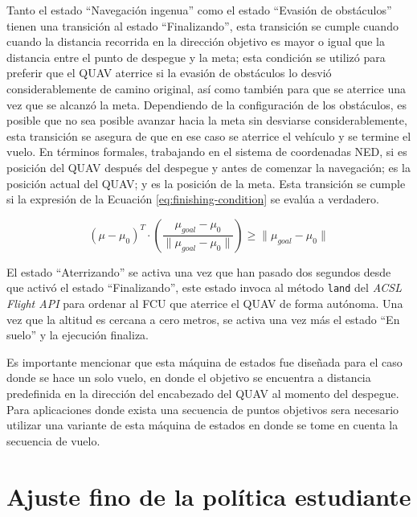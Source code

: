 Tanto el estado ``Navegación ingenua'' como el estado ``Evasión de obstáculos'' tienen una transición al estado ``Finalizando'', esta transición se cumple cuando cuando la distancia recorrida en la dirección objetivo es mayor o igual que la distancia entre el punto de despegue y la meta; esta condición se utilizó para preferir que el QUAV aterrice si la evasión de obstáculos lo desvió considerablemente de camino original, así como también para que se aterrice una vez que se alcanzó la meta. Dependiendo de la configuración de los obstáculos, es posible que no sea posible avanzar hacia la meta sin desviarse considerablemente, esta transición se asegura de que en ese caso se aterrice el vehículo y se termine el vuelo. En términos formales, trabajando en el sistema de coordenadas NED, si  es posición del QUAV después del despegue y antes de comenzar la navegación; \jim{\mu} es la posición actual del QUAV; y  es la posición de la meta. Esta transición se cumple si la expresión de la Ecuación \ref{eq:finishing-condition} se evalúa a verdadero.

\begin{equation}
    \label{eq:finishing-condition}
    (\mu - \mu_0)^T \cdot \left (\frac{\mu_{goal} - \mu_0}{\|\mu_{goal} - \mu_0\|}  \right) \geq \|\mu_{goal} - \mu_0\|
\end{equation}

El estado ``Aterrizando'' se activa una vez que han pasado dos segundos desde que activó el estado ``Finalizando'', este estado invoca al método \texttt{land} del \textit{ACSL Flight API} para ordenar al FCU que aterrice el QUAV de forma autónoma. Una vez que la altitud es cercana a cero metros, se activa una vez más el estado ``En suelo'' y la ejecución finaliza.

Es importante mencionar que esta máquina de estados fue diseñada para el caso donde se hace un solo vuelo, en donde el objetivo se encuentra a distancia predefinida en la dirección del encabezado del QUAV al momento del despegue. Para aplicaciones donde exista una secuencia de puntos objetivos sera necesario utilizar una variante de esta máquina de estados en donde se tome en cuenta la secuencia de vuelo. 

\section{Ajuste fino de la política estudiante}

\label{sec:imp-finetune}


